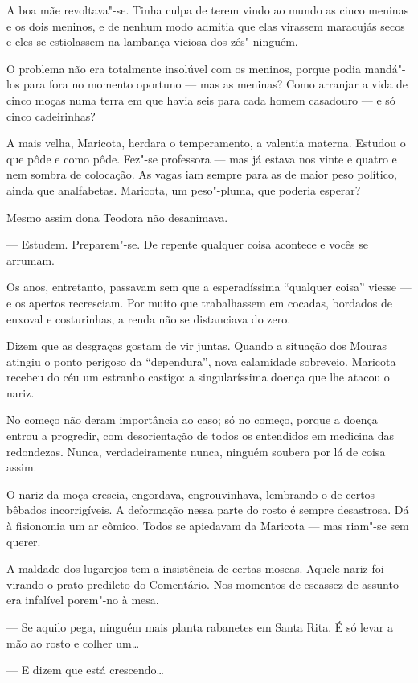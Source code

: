 A boa mãe revoltava"-se. Tinha culpa de terem vindo ao mundo as cinco
meninas e os dois meninos, e de nenhum modo admitia que elas virassem
maracujás secos e eles se estiolassem na lambança viciosa dos
zés"-ninguém.

O problema não era totalmente insolúvel com os meninos, porque podia
mandá"-los para fora no momento oportuno --- mas as meninas? Como
arranjar a vida de cinco moças numa terra em que havia seis para cada
homem casadouro --- e só cinco cadeirinhas?

A mais velha, Maricota, herdara o temperamento, a valentia materna.
Estudou o que pôde e como pôde. Fez"-se professora --- mas já estava nos
vinte e quatro e nem sombra de colocação. As vagas iam sempre para as de
maior peso político, ainda que analfabetas. Maricota, um peso"-pluma, que
poderia esperar?

Mesmo assim dona Teodora não desanimava.

--- Estudem. Preparem"-se. De repente qualquer coisa acontece e vocês se
arrumam.

Os anos, entretanto, passavam sem que a esperadíssima ``qualquer coisa''
viesse --- e os apertos recresciam. Por muito que trabalhassem em
cocadas, bordados de enxoval e costurinhas, a renda não se distanciava
do zero.

Dizem que as desgraças gostam de vir juntas. Quando a situação dos
Mouras atingiu o ponto perigoso da ``dependura'', nova calamidade
sobreveio. Maricota recebeu do céu um estranho castigo: a singularíssima
doença que lhe atacou o nariz.

No começo não deram importância ao caso; só no começo, porque a doença
entrou a progredir, com desorientação de todos os entendidos em medicina
das redondezas. Nunca, verdadeiramente nunca, ninguém soubera por lá de
coisa assim.

O nariz da moça crescia, engordava, engrouvinhava, lembrando o de certos
bêbados incorrigíveis. A deformação nessa parte do rosto é sempre
desastrosa. Dá à fisionomia um ar cômico. Todos se apiedavam da Maricota
--- mas riam"-se sem querer.

A maldade dos lugarejos tem a insistência de certas moscas. Aquele nariz
foi virando o prato predileto do Comentário. Nos momentos de escassez de
assunto era infalível porem"-no à mesa.

--- Se aquilo pega, ninguém mais planta rabanetes em Santa Rita. É só
levar a mão ao rosto e colher um\ldots{}

--- E dizem que está crescendo\ldots{}

